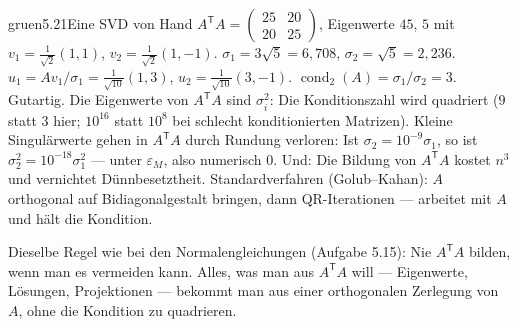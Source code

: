 \begin{loesungkarte}{gruen}{5.21}{Eine SVD von Hand}
$A^{\mathsf T}A = \begin{pmatrix}25 & 20\\ 20 & 25\end{pmatrix}$, Eigenwerte $45$, $5$ mit $v_1 = \frac1{\sqrt2}(1, 1)$, $v_2 = \frac1{\sqrt2}(1, -1)$. $\sigma_1 = 3\sqrt5 = 6{,}708$, $\sigma_2 = \sqrt5 = 2{,}236$. $u_1 = Av_1/\sigma_1 = \frac1{\sqrt{10}}(1, 3)$, $u_2 = \frac1{\sqrt{10}}(3, -1)$.
$\operatorname{cond}_2(A) = \sigma_1/\sigma_2 = 3$. Gutartig.
Die Eigenwerte von $A^{\mathsf T}A$ sind $\sigma_i^{2}$: Die Konditionszahl wird quadriert ($9$ statt $3$ hier; $10^{16}$ statt $10^{8}$ bei schlecht konditionierten Matrizen). Kleine Singulärwerte gehen in $A^{\mathsf T}A$ durch Rundung verloren: Ist $\sigma_2 = 10^{-9}\sigma_1$, so ist $\sigma_2^{2} = 10^{-18}\sigma_1^{2}$ --- unter $\varepsilon_M$, also numerisch $0$. Und: Die Bildung von $A^{\mathsf T}A$ kostet $n^{3}$ und vernichtet Dünnbesetztheit. Standardverfahren (Golub--Kahan): $A$ orthogonal auf Bidiagonalgestalt bringen, dann QR-Iterationen --- arbeitet mit $A$ und hält die Kondition.
\begin{mitnehmen}\kastentext
Dieselbe Regel wie bei den Normalengleichungen (Aufgabe 5.15): Nie $A^{\mathsf T}A$ bilden, wenn man es vermeiden kann. Alles, was man aus $A^{\mathsf T}A$ will --- Eigenwerte, Lösungen, Projektionen --- bekommt man aus einer orthogonalen Zerlegung von $A$, ohne die Kondition zu quadrieren.
\end{mitnehmen}
\end{loesungkarte}

